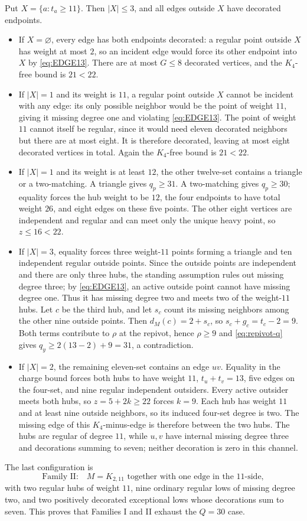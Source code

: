 Put $X=\{a:t_a\geq11\}$. Then $|X|\leq3$, and all edges outside $X$ have decorated endpoints.
\begin{itemize}
\item If $X=\varnothing$, every edge has both endpoints decorated: a regular point outside $X$ has weight at most $2$, so an incident edge would force its other endpoint into $X$ by \cref{eq:EDGE13}. There are at most $G\leq8$ decorated vertices, and the $K_4$-free bound is $21<22$.
\item If $|X|=1$ and its weight is $11$, a regular point outside $X$ cannot be incident with any edge: its only possible neighbor would be the point of weight $11$, giving it missing degree one and violating \cref{eq:EDGE13}. The point of weight $11$ cannot itself be regular, since it would need eleven decorated neighbors but there are at most eight. It is therefore decorated, leaving at most eight decorated vertices in total. Again the $K_4$-free bound is $21<22$.
\item If $|X|=1$ and its weight is at least $12$, the other twelve-set contains a triangle or a two-matching. A triangle gives $q_p\geq31$. A two-matching gives $q_p\geq30$; equality forces the hub weight to be $12$, the four endpoints to have total weight $26$, and eight edges on these five points. The other eight vertices are independent and regular and can meet only the unique heavy point, so $z\leq16<22$.
\item If $|X|=3$, equality forces three weight-$11$ points forming a triangle and ten independent regular outside points. Since the outside points are independent and there are only three hubs, the standing assumption rules out missing degree three; by \cref{eq:EDGE13}, an active outside point cannot have missing degree one. Thus it has missing degree two and meets two of the weight-$11$ hubs. Let $c$ be the third hub, and let $s_c$ count its missing neighbors among the other nine outside points. Then $d_M(c)=2+s_c$, so $s_c+g_c=t_c-2=9$. Both terms contribute to $\rho$ at the repivot, hence $\rho\geq9$ and \cref{eq:repivot-q} gives $q_y\geq2(13-2)+9=31$, a contradiction.
\item If $|X|=2$, the remaining eleven-set contains an edge $uv$. Equality in the charge bound forces both hubs to have weight $11$, $t_u+t_v=13$, five edges on the four-set, and nine regular independent outsiders. Every active outsider meets both hubs, so $z=5+2k\geq22$ forces $k=9$. Each hub has weight $11$ and at least nine outside neighbors, so its induced four-set degree is two. The missing edge of this $K_4$-minus-edge is therefore between the two hubs. The hubs are regular of degree $11$, while $u,v$ have internal missing degree three and decorations summing to seven; neither decoration is zero in this channel.
\end{itemize}
The last configuration is
\[
\text{Family II:}\quad
M=K_{2,11}\text{ together with one edge in the }11\text{-side},
\]
with two regular hubs of weight $11$, nine ordinary regular lows of missing degree two, and two positively decorated exceptional lows whose decorations sum to seven. This proves that Families I and II exhaust the $Q=30$ case.


